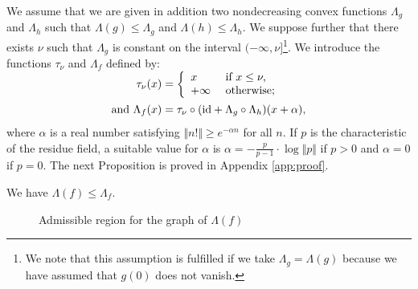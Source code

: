 \documentclass{sig-alternate}
\newcommand{\id}{\textrm{id}}
\begin{document}
We assume that we are given in addition two nondecreasing convex 
functions $\Lambda_g$ and $\Lambda_h$ such that $\Lambda(g) \leq 
\Lambda_g$ and $\Lambda(h) \leq \Lambda_h$. We suppose further that 
there exists $\nu$ such that $\Lambda_g$ is constant on the interval 
$({-}\infty, \nu]$\footnote{We note that this assumption is fulfilled if 
we take $\Lambda_g = \Lambda(g)$ because we have assumed that $g(0)$ 
does not vanish.}. We introduce the functions $\tau_\nu$ and $\Lambda_f$ 
defined by:
\begin{align*}
\tau_\nu(x) &= \smash{\left\{\begin{array}{ll} x & \mbox{ if } x \le \nu, \\
+\infty & \mbox{ otherwise;} \end{array}\right.} \\[8pt]
\mbox{and } \Lambda_f(x) &= \tau_\nu \circ (\id + \Lambda_g \circ \Lambda_h)(x + \alpha),
\end{align*}
where $\alpha$ is a real number satisfying $\Vert n! \Vert \geq 
e^{-\alpha n}$ for all $n$. If $p$ is the characteristic of the residue field,
a suitable value for $\alpha$ is $\alpha = - 
\frac p {p-1} \cdot \log \Vert p \Vert$ if $p > 0$ and $\alpha = 0$ if $p = 0$.
The next Proposition is proved in Appendix \ref{app:proof}.

\begin{prop}
\label{prop:boundLambdaf} \label{PROP:BOUNDLAMBDAF}
We have $\Lambda(f) \leq \Lambda_f$.
\end{prop}

\begin{figure}
\null \hfill
{}
\hfill \null

\caption{Admissible region for the graph of $\Lambda(f)$}
\label{fig:area}
\end{figure}
\end{document}
